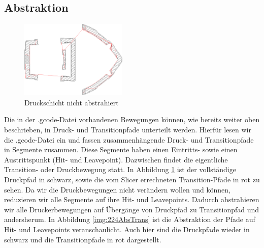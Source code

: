 \documentclass[12pt, a4paper]{article}
\begin{document}
\subsection{Abstraktion}
\begin{figure}
	\includegraphics[width=5.1cm]{3DBenchylarge_gcode-224-Full-Transitions.png}
	\caption[Druckschicht nicht abstrahiert\newline Screenshot erstellt mit unserem PrintOptimizer]{Druckschicht nicht abstrahiert}
    \label{img:224FullTrans}
\end{figure}
Die in der .gcode-Datei vorhandenen Bewegungen können, wie bereits weiter oben beschrieben, in Druck- und Transitionpfade unterteilt werden. Hierfür lesen wir die .gcode-Datei ein und fassen zusammenhängende Druck- und Transitionpfade in Segmente zusammen. Diese Segmente haben einen Eintritts- sowie einen Austrittspunkt (Hit- und Leavepoint). Dazwischen findet die eigentliche Transition- oder Druckbewegung statt.
In Abbildung \ref{img:224FullTrans} ist der vollständige Druckpfad in schwarz, sowie die vom Slicer errechneten Transition-Pfade in rot zu sehen. Da wir die Druckbewegungen nicht verändern wollen und können, reduzieren wir alle Segmente auf ihre Hit- und Leavepoints. 
Dadurch abstrahieren wir alle Druckerbewegungen auf Übergänge von Druckpfad zu Transitionpfad und andersherum. In Abbildung \ref{img:224AbsTrans} ist die Abstraktion der Pfade auf Hit- und Leavepoints veranschaulicht. Auch hier sind die Druckpfade wieder in schwarz und die Transitionpfade in rot dargestellt.
\end{document}

